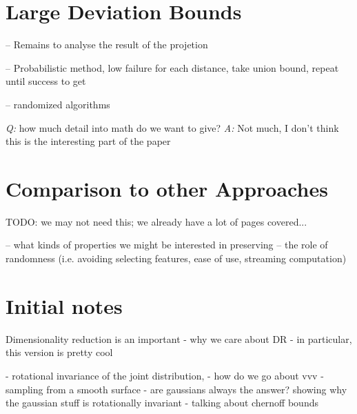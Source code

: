 \documentclass[11pt]{article}
\begin{document}
\section{Large Deviation Bounds}

-- Remains to analyse the result of the projetion

-- Probabilistic method, low failure for each distance, take union bound, repeat
until success to get

-- randomized algorithms

\emph{Q:} how much detail into math do we want to give?
\emph{A:} Not much, I don't think this is the interesting part of the paper


\section{Comparison to other Approaches}
TODO: we may not need this; we already have a lot of pages covered...

-- what kinds of properties we might be interested in preserving
-- the role of randomness (i.e. avoiding selecting features, ease of use, streaming computation)


\section{Initial notes}

Dimensionality reduction is an important 
- why we care about DR
- in particular, this version is pretty cool

- rotational invariance of the joint distribution, 
- how do we go about vvv 
- sampling from a smooth surface
- are gaussians always the answer?
showing why the gaussian stuff is rotationally invariant
- talking about chernoff bounds
{}

\end{document}
